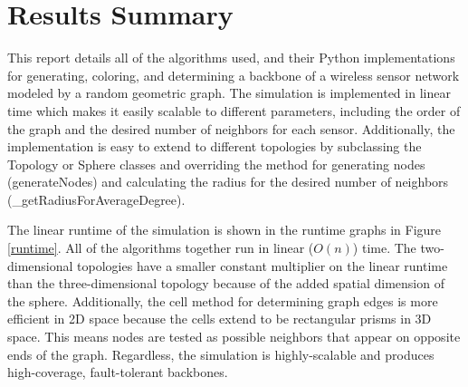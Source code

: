 \documentclass{article}
\begin{document}
\section{Results Summary}
This report details all of the algorithms used, and their Python implementations for generating, coloring, and determining a backbone of a wireless sensor network modeled by a random geometric graph. The simulation is implemented in linear time which makes it easily scalable to different parameters, including the order of the graph and the desired number of neighbors for each sensor. Additionally, the implementation is easy to extend to different topologies by subclassing the Topology or Sphere classes and overriding the method for generating nodes (generateNodes) and calculating the radius for the desired number of neighbors (\_getRadiusForAverageDegree).
\par
The linear runtime of the simulation is shown in the runtime graphs in Figure \ref{runtime}. All of the algorithms together run in linear ($O(n)$) time. The two-dimensional topologies have a smaller constant multiplier on the linear runtime than the three-dimensional topology because of the added spatial dimension of the sphere. Additionally, the cell method for determining graph edges is more efficient in 2D space because the cells extend to be rectangular prisms in 3D space. This means nodes are tested as possible neighbors that appear on opposite ends of the graph. Regardless, the simulation is highly-scalable and produces high-coverage, fault-tolerant backbones.

\newpage
\end{document}
